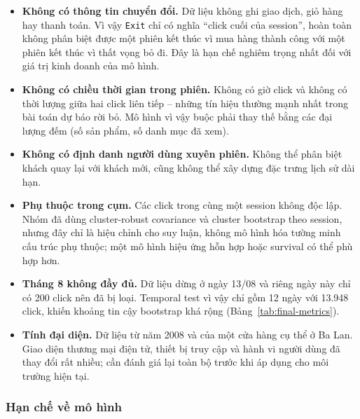 \begin{itemize}
  \item \textbf{Không có thông tin chuyển đổi.} Dữ liệu không ghi giao dịch, giỏ
  hàng hay thanh toán. Vì vậy \texttt{Exit} chỉ có nghĩa ``click cuối của
  session'', hoàn toàn không phân biệt được một phiên kết thúc vì mua hàng thành
  công với một phiên kết thúc vì thất vọng bỏ đi. Đây là hạn chế nghiêm trọng
  nhất đối với giá trị kinh doanh của mô hình.

  \item \textbf{Không có chiều thời gian trong phiên.} Không có giờ click và
  không có thời lượng giữa hai click liên tiếp -- những tín hiệu thường mạnh nhất
  trong bài toán dự báo rời bỏ. Mô hình vì vậy buộc phải thay thế bằng các đại
  lượng đếm (số sản phẩm, số danh mục đã xem).

  \item \textbf{Không có định danh người dùng xuyên phiên.} Không thể phân biệt
  khách quay lại với khách mới, cũng không thể xây dựng đặc trưng lịch sử dài hạn.

  \item \textbf{Phụ thuộc trong cụm.} Các click trong cùng một session không độc
  lập. Nhóm đã dùng cluster-robust covariance và cluster bootstrap theo session,
  nhưng đây chỉ là hiệu chỉnh cho suy luận, không mô hình hóa tường minh cấu trúc
  phụ thuộc; một mô hình hiệu ứng hỗn hợp hoặc survival có thể phù hợp hơn.

  \item \textbf{Tháng 8 không đầy đủ.} Dữ liệu dừng ở ngày 13/08 và riêng ngày
  này chỉ có 200 click nên đã bị loại. Temporal test vì vậy chỉ gồm 12 ngày với
  13.948 click, khiến khoảng tin cậy bootstrap khá rộng
  (Bảng~\ref{tab:final-metrics}).

  \item \textbf{Tính đại diện.} Dữ liệu từ năm 2008 và của một cửa hàng cụ thể ở
  Ba Lan. Giao diện thương mại điện tử, thiết bị truy cập và hành vi người dùng
  đã thay đổi rất nhiều; cần đánh giá lại toàn bộ trước khi áp dụng cho môi
  trường hiện tại.
\end{itemize}

\subsubsection{Hạn chế về mô hình}

